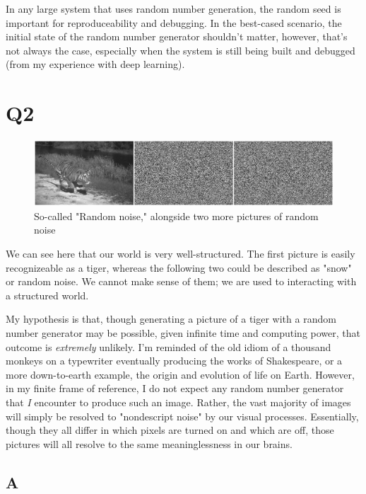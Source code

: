 \documentclass{article}
\begin{document}
In any large system that uses random number generation, the random seed is 
important for reproduceability and debugging. In the best-cased 
scenario, the initial state of the random number generator shouldn't 
matter, however, that's not always the case, especially when the system is 
still being built and debugged (from my experience with deep learning).

\section{Q2}

\begin{figure}[!ht]
	\centering
	\includegraphics[width=180mm]{tiger-and-noise.png}
	\caption{So-called "Random noise," alongside two more pictures of random noise}
\end{figure}

We can see here that our world is very well-structured. The first picture is 
easily recognizeable as a tiger, whereas the following two could be described 
as "snow" or random noise. We cannot make sense of them; we are used to 
interacting with a structured world.

My hypothesis is that, though generating a picture of a tiger with a random 
number generator may be possible, given infinite time and computing power, that 
outcome is \textit{extremely} unlikely. I'm reminded of the old idiom of a 
thousand monkeys on a typewriter eventually producing the works of Shakespeare, 
or a more down-to-earth example, the origin and evolution of life on Earth. 
However, in my finite frame of reference, I do not expect any random number 
generator that \textit{I} encounter to produce such an image. Rather, the vast 
majority of images will simply be resolved to "nondescript noise" by our visual 
processes. Essentially, though they all differ in which pixels are turned on 
and which are off, those pictures will all resolve to the same meaninglessness 
in our brains.

\subsection{A}
\end{document}

